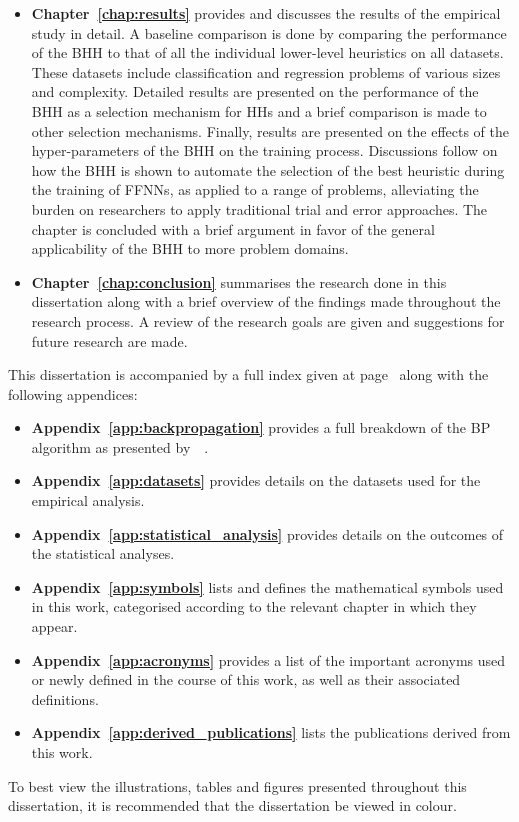 \begin{itemize}
      \item \textbf{Chapter~\ref{chap:results}} provides and discusses the results of the empirical study in detail. A baseline comparison is done by comparing the performance of the \Acs{BHH} to that of all the individual lower-level heuristics on all datasets. These datasets include classification and regression problems of various sizes and complexity.  Detailed results are presented on the performance of the \Acs{BHH} as a selection mechanism for \acp{HH} and a brief comparison is made to other selection mechanisms. Finally, results are presented on the effects of the hyper-parameters of the \Acs{BHH} on the training process. Discussions follow on how the \Acs{BHH} is shown to automate the selection of the best heuristic during the training of \acp{FFNN}, as applied to a range of problems, alleviating the burden on researchers to apply traditional trial and error approaches. The chapter is concluded with a brief argument in favor of the general applicability of the \Acs{BHH} to more problem domains.

      \item \textbf{Chapter~\ref{chap:conclusion}} summarises the research done in this dissertation along with a brief overview of the findings made throughout the research process. A review of the research goals are given and suggestions for future research are made.
\end{itemize}

\noindent
This dissertation is accompanied by a full index given at page~\pageref{index} along with the following appendices:

\begin{itemize}
      \item \textbf{Appendix~\ref{app:backpropagation}} provides a full breakdown of the \acf{BP} algorithm as presented by~\citeauthor{ref:engelbrecht:2007}~\cite{ref:engelbrecht:2007}.

      \item \textbf{Appendix~\ref{app:datasets}} provides details on the datasets used for the empirical analysis.

      \item \textbf{Appendix~\ref{app:statistical_analysis}} provides details on the outcomes of the statistical analyses.

      \item \textbf{Appendix~\ref{app:symbols}} lists and defines the mathematical symbols used in this work, categorised according to the relevant chapter in which they appear.

      \item \textbf{Appendix~\ref{app:acronyms}} provides a list of the important acronyms used or newly defined in the course of this work, as well as their associated definitions.

      \item \textbf{Appendix~\ref{app:derived_publications}} lists the publications derived from this work.
\end{itemize}

\noindent
To best view the illustrations, tables and figures presented throughout this dissertation, it is recommended that the dissertation be viewed in colour.

